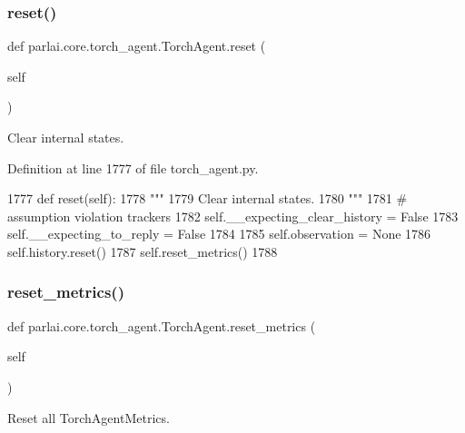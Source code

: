 \subsubsection{\texorpdfstring{reset()}{reset()}}
{\footnotesize\ttfamily def parlai.\+core.\+torch\+\_\+agent.\+Torch\+Agent.\+reset (\begin{DoxyParamCaption}\item[{}]{self }\end{DoxyParamCaption})}

\begin{DoxyVerb}Clear internal states.
\end{DoxyVerb}
 

Definition at line 1777 of file torch\+\_\+agent.\+py.


\begin{DoxyCode}
1777     \textcolor{keyword}{def }reset(self):
1778         \textcolor{stringliteral}{"""}
1779 \textcolor{stringliteral}{        Clear internal states.}
1780 \textcolor{stringliteral}{        """}
1781         \textcolor{comment}{# assumption violation trackers}
1782         self.\_\_expecting\_clear\_history = \textcolor{keyword}{False}
1783         self.\_\_expecting\_to\_reply = \textcolor{keyword}{False}
1784 
1785         self.observation = \textcolor{keywordtype}{None}
1786         self.history.reset()
1787         self.reset\_metrics()
1788 
\end{DoxyCode}
\mbox{\label{classparlai_1_1core_1_1torch__agent_1_1TorchAgent_a03e18955cfd44dd019d0847bc7a46893}} 
\subsubsection{\texorpdfstring{reset\+\_\+metrics()}{reset\_metrics()}}
{\footnotesize\ttfamily def parlai.\+core.\+torch\+\_\+agent.\+Torch\+Agent.\+reset\+\_\+metrics (\begin{DoxyParamCaption}\item[{}]{self }\end{DoxyParamCaption})}

\begin{DoxyVerb}Reset all TorchAgentMetrics.
\end{DoxyVerb}
 

